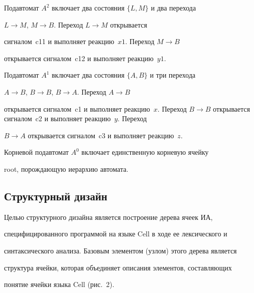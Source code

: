       


      Подавтомат $A^2$ включает два состояния $\{L, M\}$ и два перехода 


$L\rightarrow M$, $M\rightarrow B$. Переход $L\rightarrow M$ открывается 


сигналом~c11 и выполняет реакцию~$x1$. Переход $M\rightarrow B$ 


открывается сигналом~c12 и выполняет реакцию~$y1$.


      


      Подавтомат $A^1$ включает два состояния $\{A, B\}$ и три перехода 


$A\rightarrow B$, $B\rightarrow B$, $B\rightarrow A$. Переход $A\rightarrow B$ 


открывается сигналом~c1 и выполняет реакцию~$x$. Переход $B\rightarrow 


B$ открывается сигналом~c2 и выполняет реакцию~$y$. Переход 


$B\rightarrow A$ открывается сигналом~c3 и выполняет реакцию~$z$.


      


      Корневой подавтомат $A^0$ включает единственную корневую ячейку 


root, порождающую иерархию автомата.


      








\subsection{Структурный дизайн}





      Целью структурного дизайна является построение дерева ячеек ИА, 


специфицированного программой на языке Cell в ходе ее лексического и 


синтаксического анализа. Базовым элементом (узлом) этого дерева является 


структура ячейки, которая объединяет описания элементов, составляющих 


понятие ячейки языка Cell (рис.~2).


      


